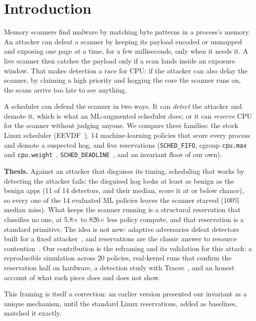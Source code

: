 \documentclass[conference]{IEEEtran}
\begin{document}
\section{Introduction}
Memory scanners find malware by matching byte patterns in a process's memory.
An attacker can defeat a scanner by keeping its payload encoded or unmapped and
exposing one page at a time, for a few milliseconds, only when it needs it. A
live scanner then catches the payload only if a scan lands inside an exposure
window. That makes detection a race for CPU: if the attacker can also delay the
scanner, by claiming a high priority and hogging the core the scanner runs on,
the scans arrive too late to see anything.

A scheduler can defend the scanner in two ways. It can \emph{detect} the
attacker and demote it, which is what an ML-augmented scheduler does; or it can
\emph{reserve} CPU for the scanner without judging anyone. We compare three
families: the stock Linux scheduler (EEVDF~\cite{eevdf,lwn-eevdf}), 14
machine-learning policies that score every process and demote a suspected hog,
and five reservations (\texttt{SCHED\_FIFO}, cgroup \texttt{cpu.max} and
\texttt{cpu.weight}~\cite{cgroupv2}, \texttt{SCHED\_DEADLINE}~\cite{lelli-deadline},
and an invariant floor of our own).

\textbf{Thesis.} Against an attacker that disguises its timing, scheduling that
works by detecting the attacker fails: the disguised hog looks at least as
benign as the benign apps (11 of 14 detectors, and their median, score it at or
below chance), so every one of the 14 evaluated ML policies leaves the scanner
starved (100\% median miss). What keeps the scanner running is a structural
reservation that classifies no one, at 5.8$\times$ to 826$\times$ less policy
compute, and that reservation is a standard primitive. The idea is not new: adaptive
adversaries defeat detectors built for a fixed attacker~\cite{wagner-mimicry,
biggio-wild,tramer-adaptive}, and reservations are the classic answer to
resource contention~\cite{rajkumar-resource-kernels}. Our contribution is the
reframing and its validation for this attack: a reproducible simulation across
20 policies, real-kernel runs that confirm the reservation half on hardware, a
detection study with Tracee~\cite{tracee}, and an honest account of what each
piece does and does not show.

This framing is itself a correction: an earlier version presented our invariant
as a unique mechanism, until the standard Linux reservations, added as
baselines, matched it exactly.
\end{document}
